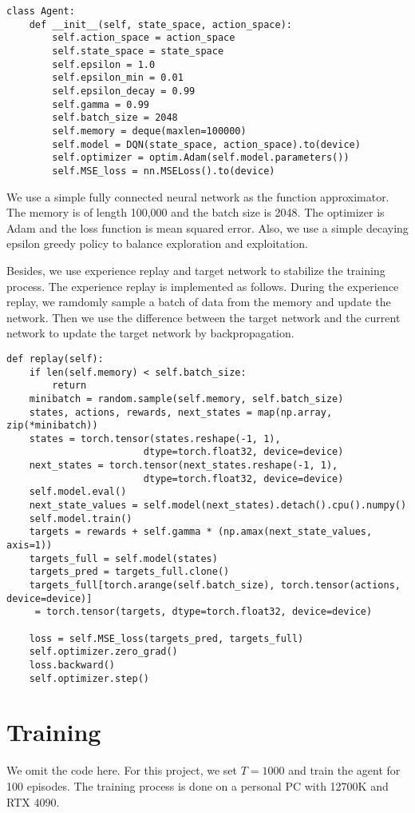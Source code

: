 \begin{verbatim}
class Agent:
    def __init__(self, state_space, action_space):
        self.action_space = action_space 
        self.state_space = state_space
        self.epsilon = 1.0
        self.epsilon_min = 0.01
        self.epsilon_decay = 0.99
        self.gamma = 0.99
        self.batch_size = 2048
        self.memory = deque(maxlen=100000)
        self.model = DQN(state_space, action_space).to(device)
        self.optimizer = optim.Adam(self.model.parameters())
        self.MSE_loss = nn.MSELoss().to(device)
\end{verbatim}
We use a simple fully connected neural network as the function approximator. The memory is of length 100,000 and the batch size is 2048. The optimizer is Adam and the loss function is mean squared error. Also, we use a simple decaying epsilon greedy policy to balance exploration and exploitation.

Besides, we use experience replay and target network to stabilize the training process. The experience replay is implemented as follows. During the experience replay, we ramdomly sample a batch of data from the memory and update the network. Then we use the difference between the target network and the current network to update the target network by backpropagation.
\begin{verbatim}
def replay(self):
    if len(self.memory) < self.batch_size:
        return
    minibatch = random.sample(self.memory, self.batch_size)
    states, actions, rewards, next_states = map(np.array, zip(*minibatch))
    states = torch.tensor(states.reshape(-1, 1), 
                        dtype=torch.float32, device=device)
    next_states = torch.tensor(next_states.reshape(-1, 1), 
                        dtype=torch.float32, device=device)
    self.model.eval()
    next_state_values = self.model(next_states).detach().cpu().numpy()
    self.model.train()
    targets = rewards + self.gamma * (np.amax(next_state_values, axis=1)) 
    targets_full = self.model(states)
    targets_pred = targets_full.clone()
    targets_full[torch.arange(self.batch_size), torch.tensor(actions, device=device)]
     = torch.tensor(targets, dtype=torch.float32, device=device)

    loss = self.MSE_loss(targets_pred, targets_full)
    self.optimizer.zero_grad()
    loss.backward()
    self.optimizer.step()
\end{verbatim}

\section{Training}
We omit the code here. For this project, we set $T=1000$ and train the agent for 100 episodes. The training process is done on a personal PC with 12700K and RTX 4090. 

